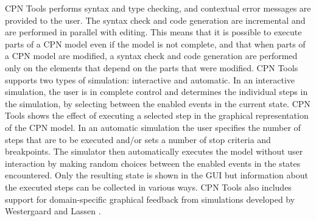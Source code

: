 

CPN Tools performs syntax and type checking, and contextual error
messages are provided to the user. The syntax check and code generation are
incremental and are performed in parallel with editing. This means
that it is possible to execute parts of a CPN model even if the model
is not complete, and that when parts of a CPN model are modified, a
syntax check and code generation are performed only on the elements
that depend on the parts that were modified. CPN Tools supports two
types of simulation: interactive and automatic. In an interactive
simulation, the user is in complete control and determines the
individual steps in the simulation, by selecting between the enabled
events in the current state. CPN Tools shows the effect of executing a
selected step in the graphical representation of the CPN model. In an
automatic simulation the user specifies the number of steps that are
to be executed and/or sets a number of stop criteria and
breakpoints. The simulator then automatically executes the model
without user interaction by making random choices between the enabled
events in the states encountered. Only the resulting state is shown in
the GUI but information about the executed steps can be collected in
various ways. CPN Tools also includes support for domain-specific
graphical feedback from simulations developed by Westergaard and
Lassen \cite{britney}.





